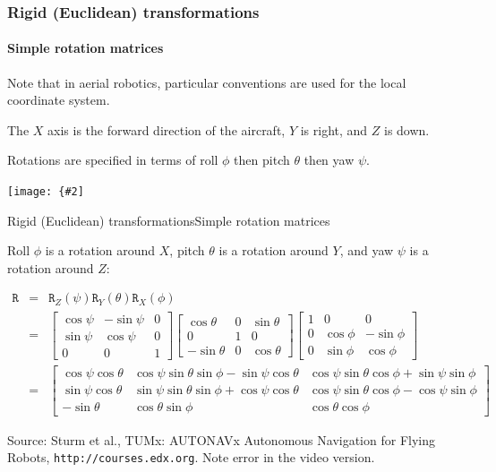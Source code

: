 \documentclass[aspectratio=169]{beamer}
\newcommand{\mat}[1]{\mathtt{#1}}
\newcommand{\myfig}[3]{\centerline{\texttt{[image: \{\#2]}}}
\begin{document}
\begin{frame}
\frametitle{Rigid (Euclidean) transformations}
\framesubtitle{Simple rotation matrices}

Note that in \alert{aerial robotics},
particular conventions are used for the
local coordinate system.

\medskip

The $X$ axis is the forward direction of the aircraft,
$Y$ is right, and $Z$ is down.

\medskip

Rotations are specified in terms of roll $\phi$ then
pitch $\theta$ then yaw $\psi$.

\myfig{2.5in}{Rollpitchyawplain}{\url{http://en.wikipedia.org/wiki/File:Rollpitchyawplain.png}}

\end{frame}


\begin{frame}{Rigid (Euclidean) transformations}{Simple rotation matrices}

Roll $\phi$ is a rotation around $X$,
pitch $\theta$ is a rotation around $Y$, and
yaw $\psi$ is a rotation around $Z$:

\begin{scriptsize}
\begin{eqnarray*}
\mat{R} & = & \mat{R}_Z(\psi) \mat{R}_Y(\theta) \mat{R}_X(\phi) \\
& = &
\begin{bmatrix}
\cos \psi & -\sin \psi & 0 \\
\sin \psi &  \cos \psi & 0 \\
0 & 0 & 1
\end{bmatrix}
\begin{bmatrix}
 \cos \theta & 0 & \sin \theta \\
 0 & 1 & 0 \\
-\sin \theta & 0 & \cos \theta
\end{bmatrix}
\begin{bmatrix}
1 & 0 & 0 \\
0 & \cos \phi & -\sin \phi \\
0 & \sin \phi &  \cos \phi
\end{bmatrix} \\
& = & \begin{bmatrix}
\cos\psi \cos\theta & \cos\psi\sin\theta\sin\phi - \sin\psi\cos\theta &
\cos\psi \sin\theta \cos\phi + \sin\psi\sin\phi \\
\sin\psi \cos\theta & \sin\psi\sin\theta\sin\phi + \cos\psi\cos\theta &
\cos\psi \sin\theta \cos\phi - \cos\psi\sin\phi \\
-\sin\theta & \cos\theta \sin\phi & \cos\theta \cos\phi
\end{bmatrix}
\end{eqnarray*}

\begin{minipage}{4in}
Source: Sturm et al., TUMx: AUTONAVx Autonomous Navigation for
Flying Robots, \texttt{http://courses.edx.org}. Note error in
the video version.
\end{minipage}

\end{scriptsize}

\end{frame}
\end{document}
